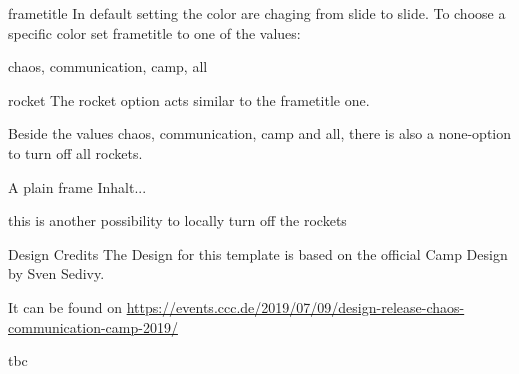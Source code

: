 \documentclass[aspectratio=169,t]{beamer}
\begin{document}
\begin{frame}{frametitle}
In default setting the color are chaging from slide to slide. 
To choose a specific color set frametitle to one of the values:

chaos, communication, camp, all
\end{frame}

\begin{frame}{rocket}
The rocket option acts similar to the frametitle one. 

Beside the values chaos, communication, camp and all, there is also a none-option to turn off all rockets.
\end{frame}

\begin{frame}[plain]{A plain frame}
Inhalt...

this is another possibility to locally turn off the rockets
\end{frame}




\begin{frame}{Design Credits}
The Design for this template is based on the official Camp Design by Sven Sedivy.

It can be found on \url{https://events.ccc.de/2019/07/09/design-release-chaos-communication-camp-2019/}
\end{frame}

\begin{frame}
	tbc
\end{frame}
\end{document}
